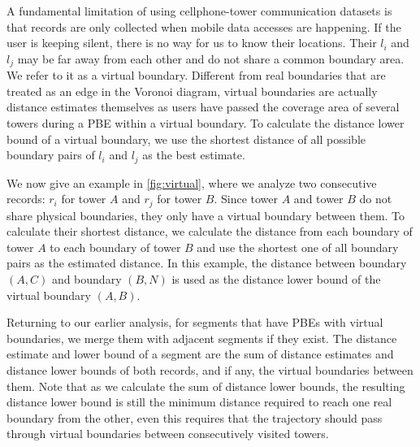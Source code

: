 A fundamental limitation of using cellphone-tower communication datasets is that records are only collected when mobile data accesses are happening. If the user is keeping silent, there is no way for us to know their locations. Their $l_i$ and $l_j$  may be far away from each other and do not share a common boundary area. We refer to it as a virtual boundary.
Different from real boundaries that are treated as an edge in the Voronoi diagram, virtual boundaries are actually distance estimates themselves as users have passed the coverage area of several towers during a PBE within a virtual boundary. To calculate the distance lower bound of a virtual boundary, we use the shortest distance of all possible boundary pairs of $l_i$ and $l_j$ as the best estimate.

We now give an example in \autoref{fig:virtual}, where we analyze two consecutive records: $r_i$ for tower $A$ and $r_j$ for tower $B$. Since tower $A$ and tower $B$ do not share physical boundaries, they only have a virtual boundary between them. To calculate their shortest distance, we calculate the distance from each boundary of tower $A$ to each boundary of tower $B$ and use the shortest one of all boundary pairs as the estimated distance. In this example, the distance between boundary $(A, C)$ and boundary $(B, N)$ is used as the distance lower bound of the virtual boundary $(A, B)$.


Returning to our earlier analysis, for segments that have PBEs with virtual boundaries, we merge them with adjacent segments if they exist. The distance estimate and lower bound of a segment are the sum of distance estimates and distance lower bounds of both records, and if any, the virtual boundaries between them. Note that as we calculate the sum of distance lower bounds, the resulting distance lower bound is still the minimum distance required to reach one real boundary from the other, even this requires that the trajectory should pass through virtual boundaries between consecutively visited towers.

